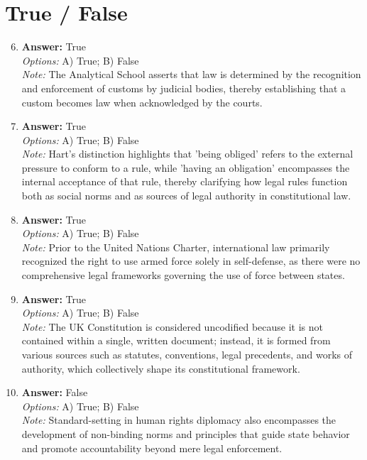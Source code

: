 \documentclass[12pt]{article}
\begin{document}
\section*{True / False}
\begin{enumerate}[label=\arabic*.]
\setcounter{enumi}{5}
\item \textbf{Answer:} True
\\ \textit{Options:} A) True; B) False
\\ \textit{Note:} The Analytical School asserts that law is determined by the recognition and enforcement of customs by judicial bodies, thereby establishing that a custom becomes law when acknowledged by the courts.
\item \textbf{Answer:} True
\\ \textit{Options:} A) True; B) False
\\ \textit{Note:} Hart's distinction highlights that 'being obliged' refers to the external pressure to conform to a rule, while 'having an obligation' encompasses the internal acceptance of that rule, thereby clarifying how legal rules function both as social norms and as sources of legal authority in constitutional law.
\item \textbf{Answer:} True
\\ \textit{Options:} A) True; B) False
\\ \textit{Note:} Prior to the United Nations Charter, international law primarily recognized the right to use armed force solely in self-defense, as there were no comprehensive legal frameworks governing the use of force between states.
\item \textbf{Answer:} True
\\ \textit{Options:} A) True; B) False
\\ \textit{Note:} The UK Constitution is considered uncodified because it is not contained within a single, written document; instead, it is formed from various sources such as statutes, conventions, legal precedents, and works of authority, which collectively shape its constitutional framework.
\item \textbf{Answer:} False
\\ \textit{Options:} A) True; B) False
\\ \textit{Note:} Standard-setting in human rights diplomacy also encompasses the development of non-binding norms and principles that guide state behavior and promote accountability beyond mere legal enforcement.
\end{enumerate}
\end{document}
